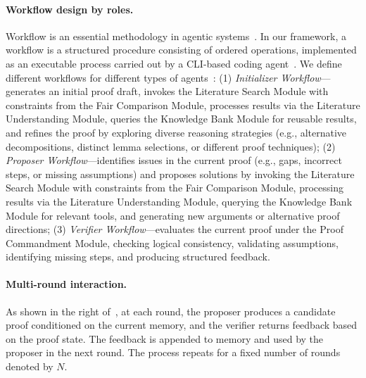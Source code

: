 \documentclass{article}
\begin{document}
\paragraph{Workflow design by roles.}
Workflow is an essential methodology in agentic systems~\citep{zhangaflow,anthropic_claude_code,openai_codex}. In our framework, a workflow is a structured procedure consisting of ordered operations, implemented as an executable process carried out by a CLI-based coding agent~\cite{anthropic_claude_code}. We define different workflows for different types of agents~\citep{zhou2025step}: 
(1) \emph{Initializer Workflow}—generates an initial proof draft, invokes the Literature Search Module with constraints from the Fair Comparison Module, processes results via the Literature Understanding Module, queries the Knowledge Bank Module for reusable results, and refines the proof by exploring diverse reasoning strategies (e.g., alternative decompositions, distinct lemma selections, or different proof techniques); 
(2) \emph{Proposer Workflow}—identifies issues in the current proof (e.g., gaps, incorrect steps, or missing assumptions) and proposes solutions by invoking the Literature Search Module with constraints from the Fair Comparison Module, processing results via the Literature Understanding Module, querying the Knowledge Bank Module for relevant tools, and generating new arguments or alternative proof directions; 
(3) \emph{Verifier Workflow}—evaluates the current proof under the Proof Commandment Module, checking logical consistency, validating assumptions, identifying missing steps, and producing structured feedback.
\vspace{-7pt}
\paragraph{Multi-round interaction.}
As shown in the right of~, at each round, the proposer produces a candidate proof conditioned on the current memory, and the verifier returns feedback based on the proof state. The feedback is appended to memory and used by the proposer in the next round. The process repeats for a fixed number of rounds denoted by $N$.
\vspace{-7pt}
\end{document}
